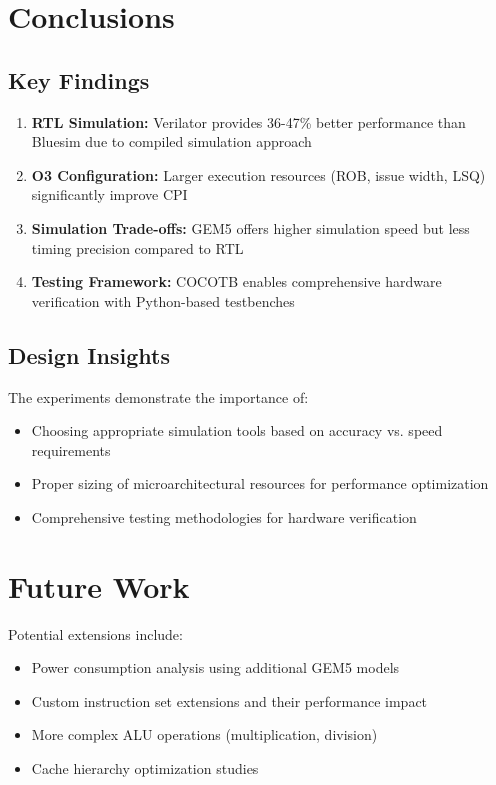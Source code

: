 \documentclass[11pt]{article}
\begin{document}
\section{Conclusions}

\subsection{Key Findings}

\begin{enumerate}
    \item \textbf{RTL Simulation:} Verilator provides 36-47\% better performance than Bluesim due to compiled simulation approach
    \item \textbf{O3 Configuration:} Larger execution resources (ROB, issue width, LSQ) significantly improve CPI
    \item \textbf{Simulation Trade-offs:} GEM5 offers higher simulation speed but less timing precision compared to RTL
    \item \textbf{Testing Framework:} COCOTB enables comprehensive hardware verification with Python-based testbenches
\end{enumerate}

\subsection{Design Insights}

The experiments demonstrate the importance of:
\begin{itemize}
    \item Choosing appropriate simulation tools based on accuracy vs. speed requirements
    \item Proper sizing of microarchitectural resources for performance optimization
    \item Comprehensive testing methodologies for hardware verification
\end{itemize}

\section{Future Work}

Potential extensions include:
\begin{itemize}
    \item Power consumption analysis using additional GEM5 models
    \item Custom instruction set extensions and their performance impact
    \item More complex ALU operations (multiplication, division)
    \item Cache hierarchy optimization studies
\end{itemize}
\end{document}
